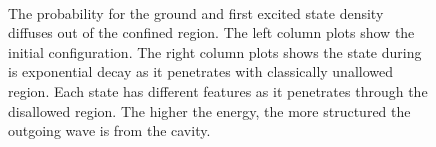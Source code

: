 \documentclass[singlepage,notitlepage,nofootinbib,11pt]{revtex4-1}
\begin{document}
\begin{figure}[h]
  \centering
  \captionsetup[subfigure]{labelformat=empty}
  \\
  \caption{\label{decaying} The probability for the ground and first excited state density diffuses out of the confined region. The left column plots show the initial configuration. The right column plots shows the state during is exponential decay as it penetrates with classically unallowed region. Each state has different features as it penetrates through the disallowed region. The higher the energy, the more structured the outgoing wave is from the cavity.}
\end{figure}
\end{document}
